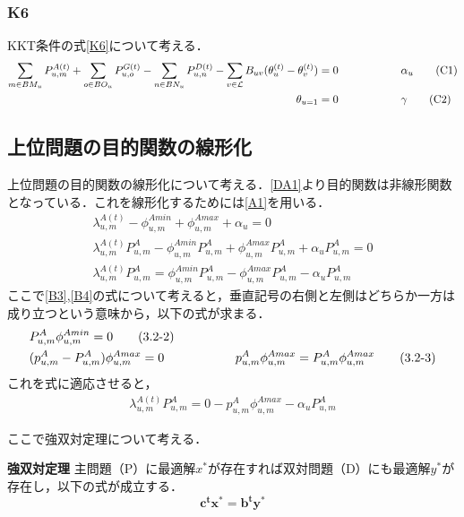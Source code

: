 \documentclass[a4j,10.5pt]{jarticle}
\begin{document}
\subsubsection{K6}
KKT条件の式\ref{K6}について考える．\\
\begin{align}
\sum_{m\in BM_u}P^{A(t)}_{u,m}+\sum_{o\in BO_u}P^{G(t)}_{u,o}-\sum_{n\in BN_u}P^{D(t)}_{u,n}-\sum_{v\in \mathcal{L}}B_{uv}(\theta_u^{(t)}-\theta_v^{(t)})=0&\hspace{20mm}\alpha_u\label{C1}\tag{C1}\\
\theta_{u=1}=0&\hspace{20mm}\gamma\label{C2}\tag{C2}
\end{align}
\subsection{上位問題の目的関数の線形化}
上位問題の目的関数の線形化について考える．\ref{DA1}より目的関数は非線形関数となっている．これを線形化するためには\ref{A1}を用いる．
\begin{align}
\lambda^{A(t)}_{u,m}-\phi_{u,m}^{Amin}+\phi_{u,m}^{Amax}+\alpha_u=0\tag{3.2-1}\label{3.2-1}\\
\lambda^{A(t)}_{u,m}P_{u,m}^A-\phi_{u,m}^{Amin}P_{u,m}^A+\phi_{u,m}^{Amax}P_{u,m}^A+\alpha_uP_{u,m}^A=0\tag{3.2-1}\label{3.2-1}\\
\lambda^{A(t)}_{u,m}P_{u,m}^A=\phi_{u,m}^{Amin}P_{u,m}^A-\phi_{u,m}^{Amax}P_{u,m}^A-\alpha_uP_{u,m}^A\tag{3.2-1}\label{3.2-1}
\end{align}
ここで\ref{B3},\ref{B4}の式について考えると，垂直記号の右側と左側はどちらか一方は成り立つという意味から，以下の式が求まる．
\begin{align}
&P_{u,m}^A\phi_{u,m}^{Amin}=0\label{3.2-2}\tag{3.2-2}\\
&(p_{u,m}^A-P_{u,m}^A)\phi_{u,m}^{Amax}=0\hspace{20mm}p_{u,m}^A\phi_{u,m}^{Amax}=P_{u,m}^A\phi_{u,m}^{Amax}\label{3.2-3}\tag{3.2-3}
\end{align}
これを式に適応させると，
\begin{align}
\lambda^{A(t)}_{u,m}P_{u,m}^A=0-p_{u,m}^A\phi_{u,m}^{Amax}-\alpha_uP_{u,m}^A\tag{3.2-4}\label{3.2-4}
\end{align}

ここで強双対定理について考える．
\begin{itembox}[l]{\bf{強双対定理}}
主問題（P）に最適解$x^*$が存在すれば双対問題（D）にも最適解$y^*$が存在し，以下の式が成立する．
\[ \bm{c^tx^*}=\bm{b^ty^*}\]
\end{itembox}
\end{document}
